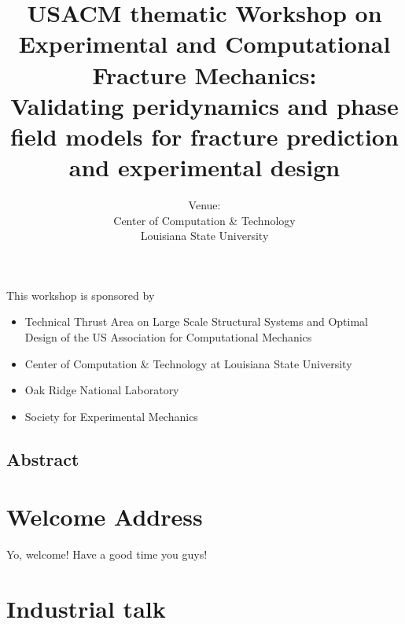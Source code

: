 \documentclass[12pt]{book}
\title{USACM thematic Workshop on Experimental and Computational Fracture Mechanics: \\
	\large Validating peridynamics and phase field models for fracture prediction and experimental design}
\author{Venue: \\ Center of Computation \& Technology \\ Louisiana State University}
\begin{document}
\frontmatter

\maketitle

This workshop is sponsored by

\begin{itemize}
\item Technical Thrust Area on Large Scale Structural Systems and Optimal Design of the US Association for Computational Mechanics
\item Center of Computation \& Technology at Louisiana State University
\item Oak Ridge National Laboratory
\item Society for Experimental Mechanics
\end{itemize}

\newpage

\section*{Abstract}


\chapter{Welcome Address}


Yo, welcome! Have a good time you guys!


\begin{sidewaysfigure}

\end{sidewaysfigure}


\tableofcontents

\mainmatter

\chapter{Industrial talk}
\end{document}
